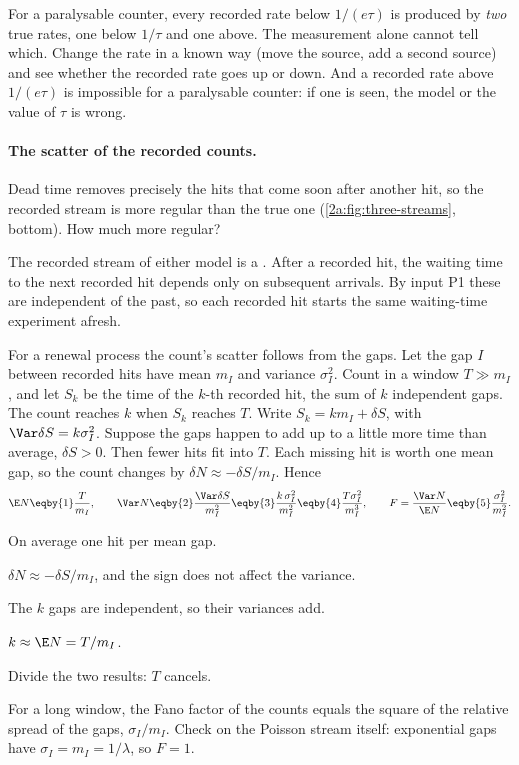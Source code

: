 \begin{pitfall}
For a paralysable counter, every recorded rate below $1/(e\tau)$ is produced by \emph{two} true rates, one below $1/\tau$ and one above. The measurement alone cannot tell which. Change the rate in a known way (move the source, add a second source) and see whether the recorded rate goes up or down. And a recorded rate above $1/(e\tau)$ is impossible for a paralysable counter: if one is seen, the model or the value of $\tau$ is wrong.
\end{pitfall}

\paragraph{The scatter of the recorded counts.} Dead time removes precisely the hits that come soon after another hit, so the recorded stream is more regular than the true one (\cref{2a:fig:three-streams}, bottom). How much more regular?

The recorded stream of either model is a  . After a recorded hit, the waiting time to the next recorded hit depends only on subsequent arrivals. By input P1 these are independent of the past, so each recorded hit starts the same waiting-time experiment afresh.

For a renewal process the count's scatter follows from the gaps. Let the gap $I$ between recorded hits have mean $m_I$ and variance $\sigma_I^2$. Count in a window $T\gg m_I$, and let $S_k$ be the time of the $k$-th recorded hit, the sum of $k$ independent gaps. The count reaches $k$ when $S_k$ reaches $T$. Write $S_k=km_I+\delta S$, with $\Var\delta S=k\sigma_I^2$. Suppose the gaps happen to add up to a little more time than average, $\delta S>0$. Then fewer hits fit into $T$. Each missing hit is worth one mean gap, so the count changes by $\delta N\approx-\delta S/m_I$. Hence
\begin{align}
  \E N \eqby{1} \frac{T}{m_I},\qquad
  \Var N \eqby{2} \frac{\Var\delta S}{m_I^2} \eqby{3} \frac{k\,\sigma_I^2}{m_I^2} \eqby{4} \frac{T\sigma_I^2}{m_I^3},\qquad
  F=\frac{\Var N}{\E N} \eqby{5} \frac{\sigma_I^2}{m_I^2}. \label{2a:eq:renewalF}
\end{align}
\begin{explain}
  \item On average one hit per mean gap.
  \item $\delta N\approx-\delta S/m_I$, and the sign does not affect the variance.
  \item The $k$ gaps are independent, so their variances add.
  \item $k\approx\E N=T/m_I$.
  \item Divide the two results: $T$ cancels.
\end{explain}
For a long window, the Fano factor of the counts equals the square of the relative spread of the gaps, $\sigma_I/m_I$. Check on the Poisson stream itself: exponential gaps have $\sigma_I=m_I=1/\lambda$, so $F=1$.

